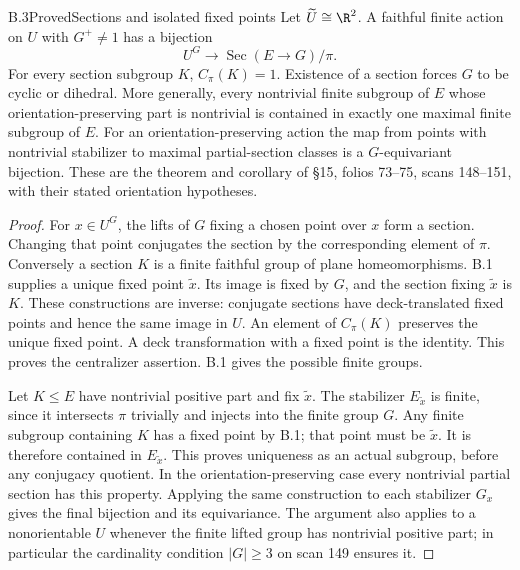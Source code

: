\begin{claim}{B.3}{Proved}{Sections and isolated fixed points}
Let $\widetilde U\cong\R^2$. A faithful finite action on $U$ with $G^+\ne1$
has a bijection
\[
 U^G\longrightarrow \operatorname{Sec}(E\to G)/\pi.
\]
For every section subgroup $K$, $C_\pi(K)=1$. Existence of a section forces $G$
to be cyclic or dihedral. More generally, every nontrivial finite subgroup of
$E$ whose orientation-preserving part is nontrivial is contained in exactly one
maximal finite subgroup of $E$. For an orientation-preserving action the map
from points with nontrivial stabilizer to maximal partial-section classes is a
$G$-equivariant bijection. These are the theorem and corollary of \S15, folios
73--75, scans 148--151, with their stated orientation hypotheses.
\end{claim}
\begin{proof}
For $x\in U^G$, the lifts of $G$ fixing a chosen point over $x$ form a section.
Changing that point conjugates the section by the corresponding element of
$\pi$. Conversely a section $K$ is a finite faithful group of plane
homeomorphisms. B.1 supplies a unique fixed point $\widetilde x$. Its image is
fixed by $G$, and the section fixing $\widetilde x$ is $K$. These constructions
are inverse: conjugate sections have deck-translated fixed points and hence
the same image in $U$. An element of $C_\pi(K)$ preserves the unique fixed point.
A deck transformation with a fixed point is the identity. This proves the
centralizer assertion. B.1 gives the possible finite groups.

Let $K\le E$ have nontrivial positive part and fix $\widetilde x$. The stabilizer
$E_{\widetilde x}$ is finite, since it intersects $\pi$ trivially and injects into
the finite group $G$. Any finite subgroup containing $K$ has a fixed point by
B.1; that point must be $\widetilde x$. It is therefore contained in
$E_{\widetilde x}$. This proves uniqueness as an actual subgroup, before any
conjugacy quotient. In the orientation-preserving case every nontrivial partial
section has this property. Applying the same construction to each stabilizer
$G_x$ gives the final bijection and its equivariance. The argument also applies
to a nonorientable $U$ whenever the finite lifted group has nontrivial positive
part; in particular the cardinality condition $|G|\ge3$ on scan 149 ensures it.
\end{proof}

